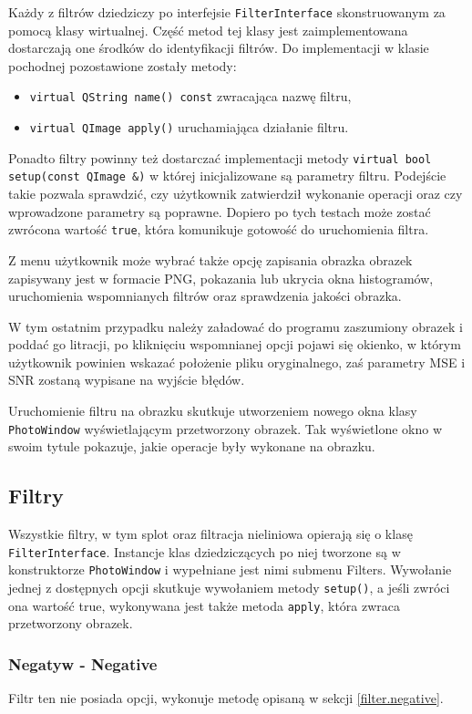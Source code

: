 \documentclass{classrep}
\begin{document}
Każdy z filtrów dziedziczy po interfejsie \texttt{FilterInterface} skonstruowanym za pomocą klasy wirtualnej. Część metod tej klasy jest zaimplementowana \ppauza dostarczają one środków do identyfikacji filtrów. Do implementacji w klasie pochodnej pozostawione zostały metody:
\begin{itemize}
 \item \texttt{virtual QString name() const} \ppauza zwracająca nazwę filtru,
 \item \texttt{virtual QImage apply()} \ppauza uruchamiająca działanie filtru.
\end{itemize}

Ponadto filtry powinny też dostarczać implementacji metody \texttt{virtual bool setup(const QImage \&)} w której inicjalizowane są parametry filtru. Podejście takie pozwala sprawdzić, czy użytkownik zatwierdził wykonanie operacji oraz czy wprowadzone parametry są poprawne. Dopiero po tych testach może zostać zwrócona wartość \texttt{true}, która komunikuje gotowość do uruchomienia filtra.

Z menu użytkownik może wybrać także opcję zapisania obrazka \ppauza obrazek zapisywany jest w formacie PNG, pokazania lub ukrycia okna histogramów, uruchomienia wspomnianych filtrów oraz sprawdzenia jakości obrazka.

W tym ostatnim przypadku należy załadować do programu zaszumiony obrazek i poddać go litracji, po kliknięciu wspomnianej opcji pojawi się okienko, w którym użytkownik powinien wskazać położenie pliku oryginalnego, zaś parametry MSE i SNR zostaną wypisane na wyjście błędów.

Uruchomienie filtru na obrazku skutkuje utworzeniem nowego okna klasy \texttt{PhotoWindow} wyświetlającym przetworzony obrazek. Tak wyświetlone okno w swoim tytule pokazuje, jakie operacje były wykonane na obrazku.

\subsection{Filtry}
Wszystkie filtry, w tym splot oraz filtracja nieliniowa opierają się o klasę \texttt{FilterInterface}. Instancje klas dziedziczących po niej tworzone są w konstruktorze \texttt{PhotoWindow} i wypełniane jest nimi submenu Filters. Wywołanie jednej z dostępnych opcji skutkuje wywołaniem metody \texttt{setup()}, a jeśli zwróci ona wartość true, wykonywana jest także metoda \texttt{apply}, która zwraca przetworzony obrazek.

\subsubsection{Negatyw - Negative}
Filtr ten nie posiada opcji, wykonuje metodę opisaną w sekcji \ref{filter.negative}.
\end{document}
